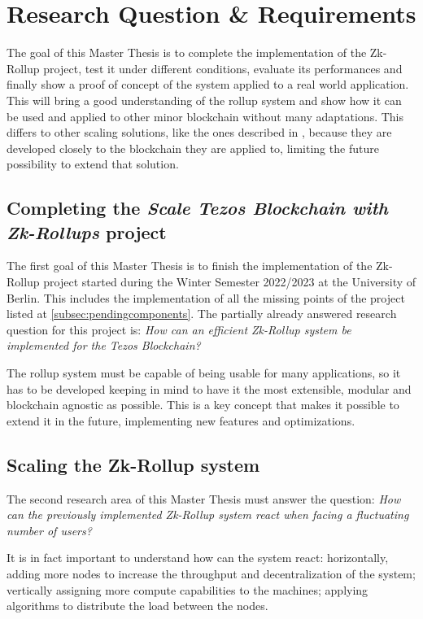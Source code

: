 \chapter{Research Question \& Requirements\label{cha:chapter3}}
The goal of this Master Thesis is to complete the implementation of the Zk-Rollup project, test it under different conditions, evaluate its performances and finally show a proof of concept of the system applied to a real world application. This will bring a good understanding of the rollup system and show how it can be used and applied to other minor blockchain without many adaptations. This differs to other scaling solutions, like the ones described in \cite{yang_review_2020}, because they are developed closely to the blockchain they are applied to, limiting the future possibility to extend that solution.

\section{Completing the \textit{Scale Tezos Blockchain with Zk-Rollups} project}
The first goal of this Master Thesis is to finish the implementation of the Zk-Rollup project started during the Winter Semester 2022/2023 at the University of Berlin. This includes the implementation of all the missing points of the project listed at \ref{subsec:pendingcomponents}. The partially already answered research question for this project is: \textit{How can an efficient Zk-Rollup system be implemented for the Tezos Blockchain?}

The rollup system must be capable of being usable for many applications, so it has to be developed keeping in mind to have it the most extensible, modular and blockchain agnostic as possible. This is a key concept that makes it possible to extend it in the future, implementing new features and optimizations.

\section{Scaling the Zk-Rollup system}
The second research area of this Master Thesis must answer the question: \textit{How can the previously implemented  Zk-Rollup system react when facing a fluctuating number of users?}

It is in fact important to understand how can the system react: horizontally, adding more nodes to increase the throughput and decentralization of the system; vertically assigning more compute capabilities to the machines; applying algorithms to distribute the load between the nodes.

